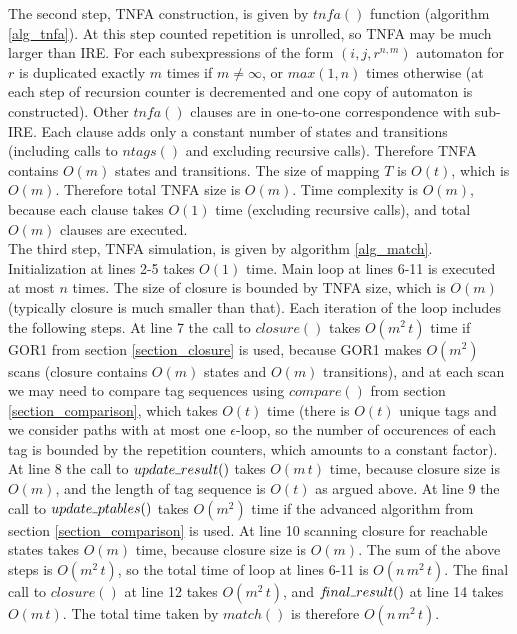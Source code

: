 \documentclass[AMA,STIX1COL]{WileyNJD-v2}
\newcommand{\Xund}{\rule{.4em}{.4pt}}
\begin{document}
The second step, TNFA construction, is given by $tn\!f\!a()$ function (algorithm \ref{alg_tnfa}).
At this step counted repetition is unrolled, so TNFA may be much larger than IRE.
For each subexpressions of the form $(i, j, r^{n,m})$ automaton for $r$ is duplicated exactly $m$ times if $m \neq \infty$, or $max(1, n)$ times otherwise
(at each step of recursion counter is decremented and one copy of automaton is constructed).
Other $tn\!f\!a()$ clauses are in one-to-one correspondence with sub-IRE.
Each clause adds only a constant number of states and transitions (including calls to $ntags()$ and excluding recursive calls).
Therefore TNFA contains $O(m)$ states and transitions. %
The size of mapping $T$ is $O(t)$, which is $O(m)$.
Therefore total TNFA size is $O(m)$.
Time complexity is $O(m)$, because each clause takes $O(1)$ time (excluding recursive calls), and total $O(m)$ clauses are executed.
\\

The third step, TNFA simulation, is given by algorithm \ref{alg_match}.
Initialization at lines 2-5 takes $O(1)$ time.
Main loop at lines 6-11 is executed at most $n$ times.
The size of closure is bounded by TNFA size, which is $O(m)$ (typically closure is much smaller than that).
Each iteration of the loop includes the following steps.
%
At line 7 the call to $closure()$ takes $O(m^2 \, t)$ time if GOR1 from section \ref{section_closure} is used,
because GOR1 makes $O(m^2)$ scans (closure contains $O(m)$ states and $O(m)$ transitions),
and at each scan we may need to compare tag sequences using $compare()$ from section \ref{section_comparison},
which takes $O(t)$ time
(there is $O(t)$ unique tags and we consider paths with at most one $\epsilon$-loop,
so the number of occurences of each tag is bounded by the repetition counters,
which amounts to a constant factor).
%
At line 8 the call to $update \Xund result()$ takes $O(m \, t)$ time,
because closure size is $O(m)$,
and the length of tag sequence is $O(t)$ as argued above.
%
At line 9 the call to $update \Xund ptables ()$ takes $O(m^2)$ time
if the advanced algorithm from section \ref{section_comparison} is used.
%
At line 10 scanning closure for reachable states takes $O(m)$ time,
because closure size is $O(m)$.
%
The sum of the above steps is $O(m^2 \, t)$, so the total time of loop at lines 6-11 is $O(n \, m^2 \, t)$.
The final call to $closure()$ at line 12 takes $O(m^2 \, t)$,
and $f\!inal \Xund result ()$ at line 14 takes $O(m \, t)$.
The total time taken by $match()$ is therefore $O(n \, m^2 \, t)$.
\\
\end{document}

